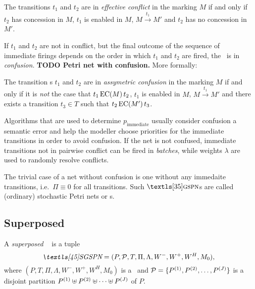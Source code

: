 \begin{dfn}
  The transitions $t_1$ and $t_2$ are in \emph{effective conflict} in
  the marking $M$  if and only if
  $t_2$ has concession in $M$, $t_1$ is enabled in $M$, $M
  \xrightarrow{t_1} M'$ and $t_2$ has no concession in $M'$.
\end{dfn}

If $t_1$ and $t_2$ are not in conflict, but the final outcome of the
sequence of immediate firings depends on the order in which $t_1$ and
$t_2$ are fired, the \gspn\ is in \emph{confusion}. \textbf{TODO Petri
  net with confusion.} More formally:

\begin{dfn}
  The transition s $t_1$ and $t_2$ are in \emph{assymetric confusion}
  in the marking $M$ if and only if it is \emph{not} the case that
  $t_1 \mathop{\textnormal{EC}\mathnormal{(M)}} t_2$, $t_1$ is enabled in $M$,
  $M \xrightarrow{t_1} M'$ and there exists a transition $t_3 \in T$
  such that $t_2 \mathop{\textnormal{EC}\mathnormal{(M')}} t_3$.
\end{dfn}

Algorithms that are used to determine $p_{\text{immediate}}$
\citep{DBLP:journals/tse/ChiolaMBC93, DBLP:journals/tse/TeruelFP03}
usually consider confusion a semantic error and help the modeller
choose priorities for the immediate transitions in order to avoid
confusion. If the net is not confused, immediate transitions not in
pairwise conflict can be fired in \emph{batches}, while weights
$\lambda$ are used to randomly resolve conflicts.

The trivial case of a net without confusion is one without any
immedaite transitions, i.e.~$\Pi \equiv 0$ for all transitions. Such
$\gspn$s are called (ordinary) stochastic Petri nets or \spn s.

\subsection*{Superposed }

\begin{dfn}
  A \emph{superposed \gspn\ \paren{\sgspn}} is a tuple
  \begin{equation}
    \SGSPN = (P, \mathcal{P}, T, \Pi, \Lambda, W^-, W^+, W^H, M_0)
    \text,
  \end{equation}
  where $(P, T, \Pi, \Lambda, W^-, W^+, W^H, M_0)$ is a \gspn\ and
  $\mathcal{P} = \{P^{(1)}, P^{(2)}, \ldots, P^{(J)}\}$ is a
  disjoint partition $P^{(1)} \uplus P^{(2)} \uplus \cdots \uplus
  P^{(J)}$ of $P$.
\end{dfn}

